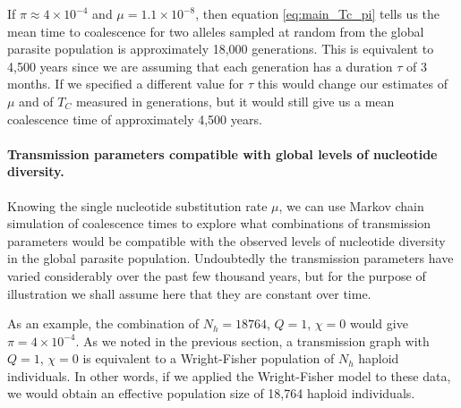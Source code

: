 \documentclass[_main.tex]{subfiles}
\begin{document}







If $\pi \approx 4 \times 10^{-4}$ and $\mu = 1.1 \times 10^{-8}$, then equation \ref{eq:main_Tc_pi} tells us the mean time to coalescence for two alleles sampled at random from the global parasite population is approximately 18,000 generations.  This is equivalent to 4,500 years since we are assuming that each generation has a duration $\tau$ of 3 months.  If we specified a different value for $\tau$ this would change our estimates of $\mu$ and of $T_C$ measured in generations, but it would still give us a mean coalescence time of approximately 4,500 years.

\paragraph{Transmission parameters compatible with global levels of nucleotide diversity.}  Knowing the single nucleotide substitution rate $\mu$, we can use Markov chain simulation of coalescence times to explore what combinations of transmission parameters would be compatible with the observed levels of nucleotide diversity in the global parasite population.  Undoubtedly the transmission parameters have varied considerably over the past few thousand years, but for the purpose of illustration we shall assume here that they are constant over time.   

As an example, the combination of $N_h = 18764$, $Q = 1$, $\chi = 0$ would give $\pi = 4 \times 10^{-4}$.  As we noted in the previous section, a transmission graph with $Q = 1$, $\chi = 0$ is equivalent to a Wright-Fisher population of $N_h$ haploid individuals.  In other words, if we applied the Wright-Fisher model to these data, we would obtain an effective population size of 18,764 haploid individuals.
\end{document}

